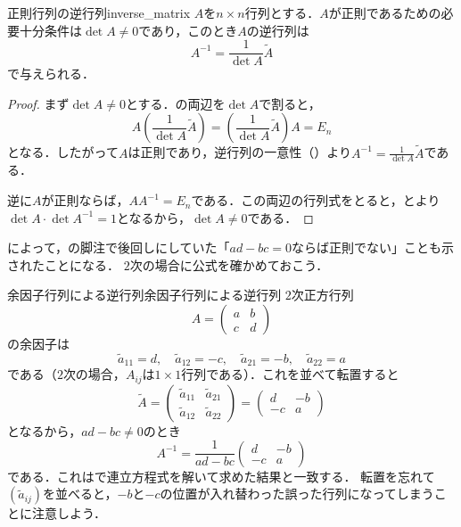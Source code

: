\begin{cor}{正則行列の逆行列}{inverse_matrix}
  $A$を$n \times n$行列とする．$A$が正則であるための必要十分条件は$\det A \ne 0$であり，このとき$A$の逆行列は
  \[
  A^{-1} = \frac{1}{\det A} \tilde{A}
  \]
  で与えられる．
\end{cor}

\begin{tleftbar}
\begin{proof}
  まず$\det A \ne 0$とする．の両辺を$\det A$で割ると，
  \[
    A \left( \frac{1}{\det A} \tilde{A} \right)
    = \left( \frac{1}{\det A} \tilde{A} \right) A
    = E_n
  \]
  となる．したがって$A$は正則であり，逆行列の一意性（）より$A^{-1} = \frac{1}{\det A} \tilde{A}$である．

  逆に$A$が正則ならば，$AA^{-1} = E_n$である．この両辺の行列式をとると，とより$\det A \cdot \det A^{-1} = 1$となるから，$\det A \ne 0$である．
\end{proof}
\end{tleftbar}

によって，の脚注で後回しにしていた「$ad - bc = 0$ならば正則でない」ことも示されたことになる．
$2$次の場合に公式を確かめておこう．

\begin{example}{余因子行列による逆行列}{余因子行列による逆行列}
  $2$次正方行列
  \[
    A = \begin{pmatrix} a & b \\ c & d \end{pmatrix}
  \]
  の余因子は
  \[
    \tilde{a}_{11} = d, \quad \tilde{a}_{12} = -c, \quad \tilde{a}_{21} = -b, \quad \tilde{a}_{22} = a
  \]
  である（$2$次の場合，$A_{ij}$は$1 \times 1$行列である）．これを並べて転置すると
  \[
    \tilde{A} = \begin{pmatrix} \tilde{a}_{11} & \tilde{a}_{21} \\ \tilde{a}_{12} & \tilde{a}_{22} \end{pmatrix}
    = \begin{pmatrix} d & -b \\ -c & a \end{pmatrix}
  \]
  となるから，$ad - bc \ne 0$のとき
  \[
    A^{-1} = \frac{1}{ad - bc}\begin{pmatrix} d & -b \\ -c & a \end{pmatrix}
  \]
  である．これはで連立方程式を解いて求めた結果と一致する．
  転置を忘れて$(\tilde{a}_{ij})$を並べると，$-b$と$-c$の位置が入れ替わった誤った行列になってしまうことに注意しよう．
\end{example}

